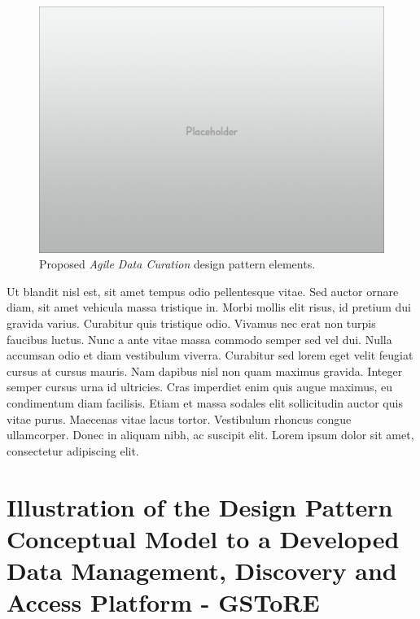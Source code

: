 \documentclass[final]{beamer}
\begin{document}
\begin{frame}[t]
\begin{multicols}{3}
\begin{figure}[htbp]
\centering
\includegraphics{placeholder.png}
\caption{Proposed \emph{Agile Data Curation} design pattern elements.}
\end{figure}

Ut blandit nisl est, sit amet tempus odio pellentesque vitae. Sed auctor
ornare diam, sit amet vehicula massa tristique in. Morbi mollis elit
risus, id pretium dui gravida varius. Curabitur quis tristique odio.
Vivamus nec erat non turpis faucibus luctus. Nunc a ante vitae massa
commodo semper sed vel dui. Nulla accumsan odio et diam vestibulum
viverra. Curabitur sed lorem eget velit feugiat cursus at cursus mauris.
Nam dapibus nisl non quam maximus gravida. Integer semper cursus urna id
ultricies. Cras imperdiet enim quis augue maximus, eu condimentum diam
facilisis. Etiam et massa sodales elit sollicitudin auctor quis vitae
purus. Maecenas vitae lacus tortor. Vestibulum rhoncus congue
ullamcorper. Donec in aliquam nibh, ac suscipit elit. Lorem ipsum dolor
sit amet, consectetur adipiscing elit.

\section{Illustration of the Design Pattern Conceptual Model to a
Developed Data Management, Discovery and Access Platform -
GSToRE}\label{illustration-of-the-design-pattern-conceptual-model-to-a-developed-data-management-discovery-and-access-platform---gstore}


\end{multicols}
\end{frame}
\end{document}
